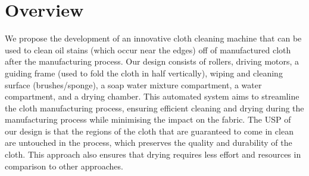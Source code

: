 \documentclass[table]{rapportCS}
\begin{document}
\section{Overview}
We propose the development of an innovative cloth cleaning machine that can be used to clean oil stains (which occur near the edges) off of manufactured cloth after the manufacturing process. Our design consists of rollers, driving motors, a guiding frame  (used to fold the cloth in half vertically), wiping and cleaning surface (brushes/sponge), a soap water mixture compartment, a water compartment, and a drying chamber. This automated system aims to streamline the cloth manufacturing process, ensuring efficient cleaning and drying during the manufacturing process while minimising the impact on the fabric. The USP of our design is that the regions of the cloth that are guaranteed to come in clean are untouched in the process, which preserves the quality and durability of the cloth. This approach also ensures that drying requires less effort and resources in comparison to other approaches.
\end{document}
